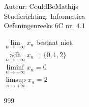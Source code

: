 \documentclass[a4paper]{article}
\newcommand{\llim}{\lim\limits}
\newcommand{\adh}{\underset{n\rightarrow+\infty}{\operatorname{adh}}}
\begin{document}
\noindent \large Auteur: CouldBeMathijs \\
\noindent \large Studierichting: Informatica\\
\noindent \large Oefeningenreeks 6C nr. 4.1\\

\medskip

\normalsize

$\llim_{n \rightarrow + \infty} x_n$ bestaat niet.\\

$\adh x_n = \{0,1,2\}$\\

$\liminf\limits_{n\rightarrow+\infty} x_n = 0$\\

$\limsup\limits_{n\rightarrow+\infty} x_n = 2$\\


\begin{thebibliography}{999}
\end{thebibliography}
\end{document}
